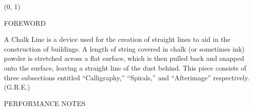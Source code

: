 \documentclass[11pt]{article}
\begin{document}
\begin{textblock}{23}(0, 1)
\begin{center}
\huge FOREWORD
\end{center}
\end{textblock}

\vspace*{0.25\baselineskip}

\begingroup
\begin{center}
A Chalk Line is a device used for the creation of straight lines to aid in the construction of buildings. A length of string covered in chalk (or sometimes ink) powder is stretched across a flat surface, which is then pulled back and snapped onto the surface, leaving a straight line of the dust behind. This piece consists of three subsections entitled ``Calligraphy,'' ``Spirals,'' and ``Afterimage'' respectively.
\rightskip\leftskip
\phantom{text} \hfill (G.R.E.)
\end{center}
\endgroup

\vspace*{5.5\baselineskip}

\begin{center}
\huge PERFORMANCE NOTES
\end{center}
\end{document}
